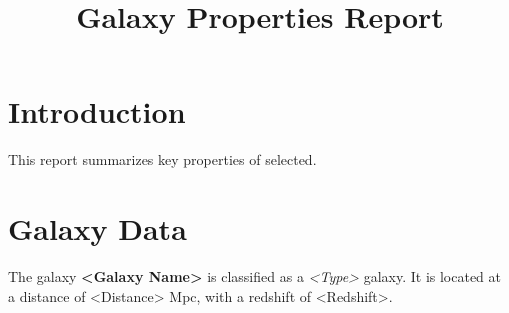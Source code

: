 \documentclass{article}
\title{Galaxy Properties Report}
\author{}
\date{}
\begin{document}
\maketitle

\section{Introduction}
This report summarizes key properties of selected.

\section{Galaxy Data}
The galaxy \textbf{<Galaxy Name>} is classified as a \textit{<Type>} galaxy. 
It is located at a distance of <Distance> Mpc, with a redshift of <Redshift>.
\end{document}
